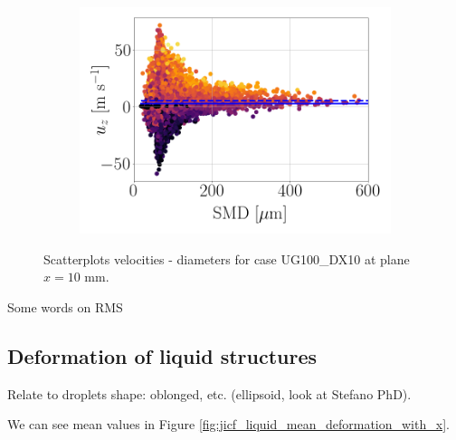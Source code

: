\begin{figure}[ht]
\begin{subfigure}[b]{0.3\textwidth}
\end{subfigure}
\hfill
\begin{subfigure}[b]{0.3\textwidth}
	\flushleft
   \includegraphics[scale=0.2]{./part2_developments/figures_ch5_resolved_JICF/SPRAY_characterization/velocities/scatter_uz_D.png}
\end{subfigure}
   \caption{Scatterplots velocities - diameters for case UG100\_DX10 at plane $x = 10$ mm.}
\label{fig:jicf_global_scatterplots}
\end{figure}

Some words on RMS


\clearpage

\subsection{Deformation of liquid structures}

Relate to droplets shape: oblonged, etc. (ellipsoid, look at Stefano PhD).

We can see mean values in Figure \ref{fig:jicf_liquid_mean_deformation_with_x}.

